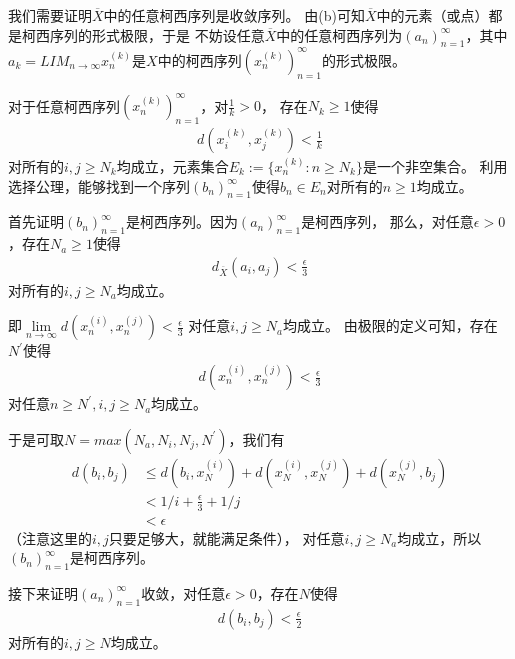 \documentclass{article}
\begin{document}
\begin{itemize}
        我们需要证明$\overline{X}$中的任意柯西序列是收敛序列。
        由(b)可知$\overline{X}$中的元素（或点）都是柯西序列的形式极限，于是
        不妨设任意$\overline{X}$中的任意柯西序列为$(a_n)_{n=1}^\infty$，其中
        $a_k = LIM_{n \to \infty} x_n^{(k)}$是$X$中的柯西序列$(x_n^{(k)})_{n=1}^\infty$的形式极限。

        对于任意柯西序列$(x_n^{(k)})_{n=1}^\infty$，对$\frac{1}{k} > 0$，
        存在$N_k \geq 1$使得
        \begin{align}
          d(x_i^{(k)}, x_j^{(k)}) < \frac{1}{k}
        \end{align}
        对所有的$i,j \geq N_k$均成立，元素集合$E_k := \{x_n^{(k)} : n \geq N_k\}$是一个非空集合。
        利用选择公理，能够找到一个序列$(b_n)_{n=1}^\infty$使得$b_n \in E_n$对所有的$n \geq 1$均成立。

        首先证明$(b_n)_{n=1}^\infty$是柯西序列。因为$(a_n)_{n=1}^\infty$是柯西序列，
        那么，对任意$\epsilon > 0$，存在$N_a \geq 1$使得
        \begin{align*}
          d_{\overline{X}}(a_i, a_j) < \frac{\epsilon}{3}
        \end{align*}
        对所有的$i, j \geq N_a$均成立。

        即$\lim\limits_{n \to \infty} d(x_n^{(i)}, x_n^{(j)}) < \frac{\epsilon}{3}$
        对任意$i,j \geq N_a$均成立。
        由极限的定义可知，存在$N^\prime$使得
        \begin{align*}
          d(x_n^{(i)}, x_n^{(j)}) < \frac{\epsilon}{3}
        \end{align*}
        对任意$n \geq N^\prime, i,j \geq N_a$均成立。

        于是可取$N = max(N_a,N_i,N_j,N^\prime)$，我们有
        \begin{align*}
          d(b_i, b_j) & \leq d(b_i, x_{N}^{(i)}) + d(x_{N}^{(i)}, x_{N}^{(j)}) + d(x_{N}^{(j)}, b_j) \\
                      & < 1/i + \frac{\epsilon}{3} + 1/j                                             \\
                      & < \epsilon
        \end{align*}
        （注意这里的$i,j$只要足够大，就能满足条件），
        对任意$i,j \geq N_a$均成立，所以$(b_n)_{n=1}^\infty$是柯西序列。

        接下来证明$(a_n)_{n=1}^\infty$收敛，对任意$\epsilon > 0$，存在$N$使得
        \begin{align*}
          d(b_i, b_j) < \frac{\epsilon}{2}
        \end{align*}
        对所有的$i,j \geq N$均成立。


\end{itemize}
\end{document}
